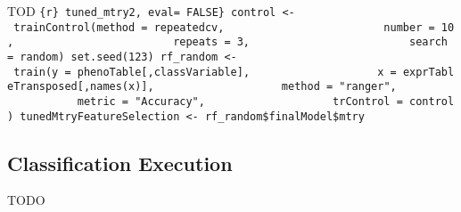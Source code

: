 \documentclass[]{article}
\begin{document}
TOD
\texttt{\{r\}\ tuned\_mtry2,\ eval=\ FALSE\}\ control\ \textless{}-\ trainControl(method\ =\ \textquotesingle{}repeatedcv\textquotesingle{},\ \ \ \ \ \ \ \ \ \ \ \ \ \ \ \ \ \ \ \ \ \ \ \ \ number\ =\ 10,\ \ \ \ \ \ \ \ \ \ \ \ \ \ \ \ \ \ \ \ \ \ \ \ \ repeats\ =\ 3,\ \ \ \ \ \ \ \ \ \ \ \ \ \ \ \ \ \ \ \ \ \ \ \ \ search\ =\ \textquotesingle{}random\textquotesingle{})\ set.seed(123)\ rf\_random\ \textless{}-\ train(y\ =\ phenoTable{[},classVariable{]},\ \ \ \ \ \ \ \ \ \ \ \ \ \ \ \ \ \ \ \ x\ =\ exprTableTransposed{[},names(x){]},\ \ \ \ \ \ \ \ \ \ \ \ \ \ \ \ \ \ \ \ method\ =\ "ranger",\ \ \ \ \ \ \ \ \ \ \ \ \ \ \ \ \ \ \ \ metric\ =\ "Accuracy",\ \ \ \ \ \ \ \ \ \ \ \ \ \ \ \ \ \ \ \ trControl\ =\ control)\ tunedMtryFeatureSelection\ \textless{}-\ rf\_random\$finalModel\$mtry}

\hypertarget{classification-execution}{%
\subsection{Classification Execution}\label{classification-execution}}

TODO
\end{document}

